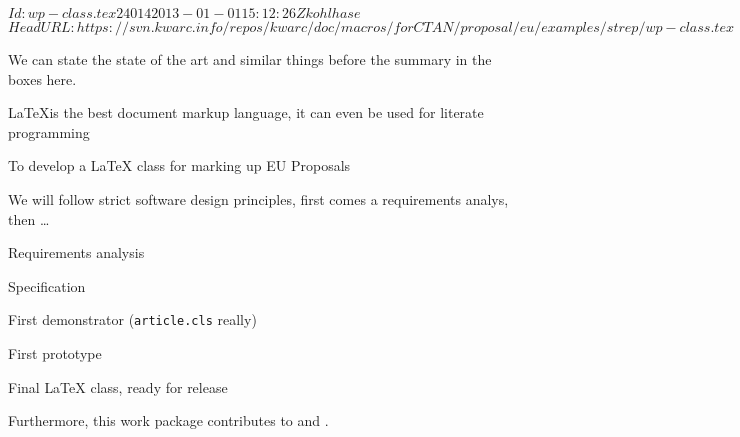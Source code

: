 \svnInfo $Id: wp-class.tex 24014 2013-01-01 15:12:26Z kohlhase $
\svnKeyword $HeadURL: https://svn.kwarc.info/repos/kwarc/doc/macros/forCTAN/proposal/eu/examples/strep/wp-class.tex $
\begin{workpackage}[id=class,type=RTD,lead=jacu,
                    wphases=3-9!1,
                    title=A {\LaTeX} class for EU Proposals,short=Class,
                    jacuRM=12,barRM=12]
We can state the state of the art and similar things before the summary in the boxes
here. 
\wpheadertable
\begin{wpobjectives}
\LaTeX is the best document markup language, it can even be used for literate
programming~\cite{DK:LP,Lamport:ladps94,Knuth:ttb84}

  To develop a {\LaTeX} class for marking up EU Proposals
\end{wpobjectives}

\begin{wpdescription}
  We will follow strict software design principles, first comes a requirements analys,
  then \ldots
\end{wpdescription}

\begin{wpdelivs}
  \begin{wpdeliv}[due=6,id=req,nature=R,dissem=PP,miles=kickoff]
     {Requirements analysis}
   \end{wpdeliv}
   \begin{wpdeliv}[due=12,id=spec,nature=R,dissem=PU,miles=consensus]
     {{\pn} Specification }
   \end{wpdeliv}
   \begin{wpdeliv}[due=18,id=demonstrator,nature=P,dissem=PU,miles={consensus,final}]
     {First demonstrator ({\tt{article.cls}} really)}
   \end{wpdeliv}
   \begin{wpdeliv}[due=24,id=proto,nature=P,dissem=PU,miles=final]
     {First prototype}
   \end{wpdeliv}
    \begin{wpdeliv}[due=36,id=release,nature=P,dissem=PU,miles=final]
      {Final {\LaTeX} class, ready for release}
    \end{wpdeliv}
  \end{wpdelivs}
Furthermore, this work package contributes to {} and
{}.
\end{workpackage}

